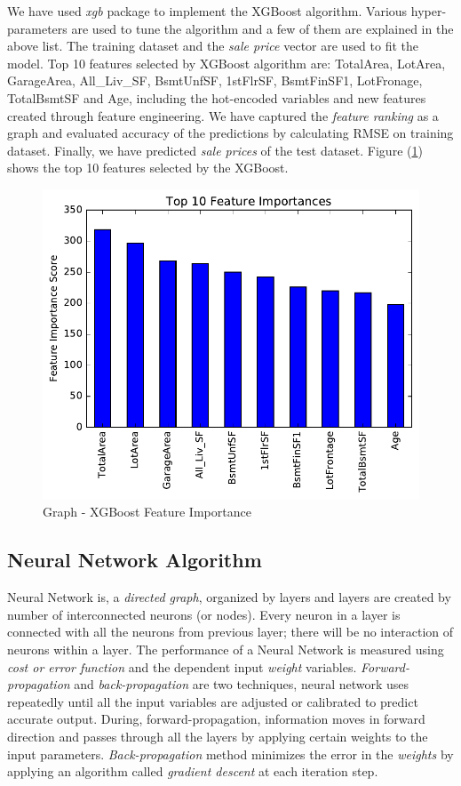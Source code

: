 \documentclass[sigconf]{acmart}
\begin{document}
We have used {\em xgb} package to implement the XGBoost algorithm. Various hyper-parameters are used to tune the algorithm and a few of them are explained in the above list. The training dataset and the {\em sale price} vector are used to fit the model. Top 10 features selected by XGBoost algorithm are: TotalArea, LotArea, GarageArea, All\_Liv\_SF, BsmtUnfSF, 1stFlrSF, BsmtFinSF1, LotFronage, TotalBsmtSF and Age, including the hot-encoded variables and new features created through feature engineering. We have captured the {\em feature ranking} as a graph and evaluated accuracy of the predictions by calculating RMSE on training dataset. Finally, we have predicted {\em sale prices} of the test dataset. Figure (\ref{fig:xgb-feature-imp}) shows the top 10 features selected by the XGBoost. 

\begin{figure}[htb]
	\centering
	\includegraphics[width=1.0\columnwidth]{images/xgboost_feature_importance2}	
	\caption{Graph - XGBoost Feature Importance} \label{fig:xgb-feature-imp} 
\end{figure}
	
	\subsection{Neural Network Algorithm}
	Neural Network is, a {\em directed graph}, organized by layers and layers are created by number of interconnected neurons (or nodes). Every neuron in a layer is connected with all the neurons from previous layer; there will be no interaction of neurons within a layer. The performance of a Neural Network is measured using {\em cost or error function} and the dependent input {\em weight} variables. {\em Forward-propagation} and {\em back-propagation} are two techniques, neural network uses repeatedly until all the input variables are adjusted or calibrated to predict accurate output. During, forward-propagation, information moves in forward direction and passes through all the layers by applying certain weights to the input parameters. {\em Back-propagation} method minimizes the error in the {\em weights} by applying an algorithm called {\em gradient descent} at each iteration step. 
	
\end{document}
